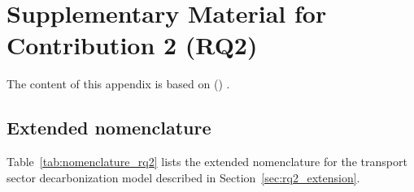 \chapter{Supplementary Material for Contribution 2 (RQ2)}\label{app:rq2}

The content of this appendix is based on \citeauthor{GOLAB2026PublicCharger} (\citeyear{GOLAB2026PublicCharger}) \cite{GOLAB2026PublicCharger}.

\section{Extended nomenclature}\label{app:rq2_nomenclature}

Table~\ref{tab:nomenclature_rq2} lists the extended nomenclature for the transport sector decarbonization model described in Section~\ref{sec:rq2_extension}.

